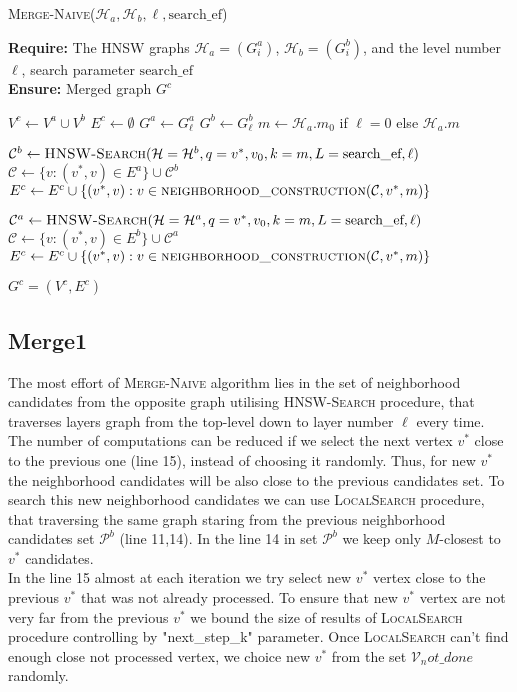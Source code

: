 \documentclass{article}
\begin{document}
\begin{algorithm}
\caption{\textsc{Merge-Naive}($\mathcal{H}_a, \mathcal{H}_b,  \ell, \text{search\_ef}$)}\label{alg:merge_naive}
\textbf{Require:} The HNSW graphs $\mathcal{H}_a = (G^a_i)$, $\mathcal{H}_b = (G^b_i)$, and the level number $\ell$, search parameter $\text{search\_ef}$ \\
\textbf{Ensure:} Merged graph $G^c$ 
\begin{algorithmic}[1]
\State $V^c \gets V^a \cup V^b$
\State $E^c \gets \emptyset$
\State $G^a \gets G^a_{\ell}$
\State $G^b \gets G^b_{\ell}$
\State $m \gets \mathcal{H}_a.m_0$ if $\ell = 0$ else $\mathcal{H}_a.m$

    \State $\mathcal{C}^b \gets \textsc{HNSW-Search}(\mathcal{H} = \mathcal{H}^b, q = v^*, v_0, k = m, L = \text{search\_ef}, \ell)$
    \State $\mathcal{C} \gets \{v : (v^*, v) \in E^a \} \cup \mathcal{C}^b$
    \State $E^c \gets E^c \cup \{(v^*, v) : v \in \textsc{neighborhood\_construction}(\mathcal{C}, v^*, m)\}$
\EndFor

    \State $\mathcal{C}^a \gets \textsc{HNSW-Search}(\mathcal{H} = \mathcal{H}^a, q = v^*, v_0, k = m, L = \text{search\_ef}, \ell)$
    \State $\mathcal{C} \gets \{v : (v^*, v) \in E^b \} \cup \mathcal{C}^a$
    \State $E^c \gets E^c \cup \{(v^*, v) : v \in \textsc{neighborhood\_construction}(\mathcal{C}, v^*, m)\}$
\EndFor

\State \Return $G^c = (V^c, E^c)$
\end{algorithmic}
\end{algorithm}

\subsection{Merge1}
The most effort of \textsc{Merge-Naive} algorithm lies in the set of neighborhood candidates from the opposite graph utilising \textsc{HNSW-Search} procedure, that traverses layers graph from the top-level down to layer number $\ell$ every time. The number of computations can be reduced if we select the next vertex $v^*$ close to the previous one (line 15), instead of choosing it randomly. Thus, for new $v^*$ the neighborhood candidates will be  also close to the previous candidates set. To search this new neighborhood candidates we can use \textsc{LocalSearch} procedure, that traversing the same graph staring from the previous neighborhood candidates set $\mathcal{P}^b$ (line 11,14). In the line 14 in set $\mathcal{P}^b$ we keep only $M$-closest to $v^*$ candidates.\\
In the line 15 almost at each iteration we try select new $v^*$ vertex close to the previous  $v^*$ that was not already processed.  
To ensure that new $v^*$ vertex are not very far from the previous $v^*$ we bound the size of results of \textsc{LocalSearch} procedure controlling by "next\_step\_k" parameter. Once \textsc{LocalSearch} can't find enough close not processed vertex, we choice new $v^*$ from the set $\mathcal{V}_not\_done$ randomly.
\end{document}
